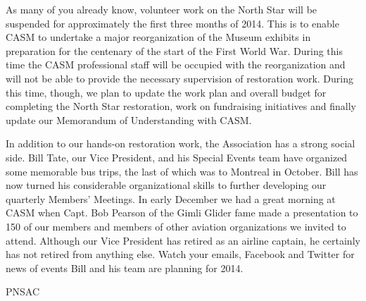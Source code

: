 As many of you already know, volunteer work on the North Star will be
suspended for approximately the first three months of 2014. This is to
enable CASM to undertake a major reorganization of the Museum exhibits
in preparation for the centenary of the start of the First World
War. During this time the CASM professional staff will be occupied
with the reorganization and will not be able to provide the necessary
supervision of restoration work. During this time, though, we plan to
update the work plan and overall budget for completing the North Star
restoration, work on fundraising initiatives and finally update our
Memorandum of Understanding with CASM.

In addition to our hands-on restoration work, the Association has a
strong social side. Bill Tate, our Vice President, and his Special
Events team have organized some memorable bus trips, the last of which
was to Montreal in October. Bill has now turned his considerable
organizational skills to further developing our quarterly Members'
Meetings. In early December we had a great morning at CASM when
Capt. Bob Pearson of the Gimli Glider fame made a presentation to 150
of our members and members of other aviation organizations we invited
to attend. Although our Vice President has retired as an airline
captain, he certainly has not retired from anything else. Watch your
emails, Facebook and Twitter for news of events Bill and his team are
planning for 2014.

\begin{footnotesize}
    \raggedleft PNSAC\\
\end{footnotesize}



